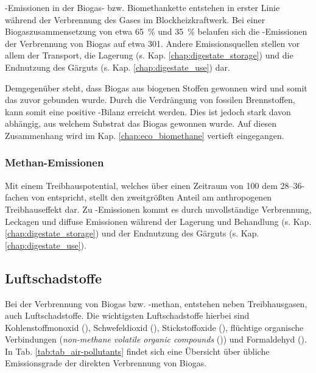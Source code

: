 -Emissionen in der Biogas- bzw. Biomethankette entstehen in erster Linie während der Verbrennung des Gases im Blockheizkraftwerk. Bei einer Biogaszusammensetzung von etwa \SI{65}{\percent}  und \SI{35}{\percent}  belaufen sich die -Emissionen der Verbrennung von Biogas auf etwa \SI[per-mode=symbol]{301}{\gcoeqkwh}. Andere Emissionsquellen stellen vor allem der Transport, die Lagerung (s. Kap. \ref{chap:digestate_storage}) und die Endnutzung des Gärguts (s. Kap. \ref{chap:digestate_use}) dar. \parencite{Nielsen2014} \parencite{Paolini2018} \smallskip

Demgegenüber steht, dass Biogas aus biogenen Stoffen gewonnen wird und somit das  zuvor gebunden wurde. Durch die Verdrängung von fossilen Brennstoffen, kann somit eine positive -Bilanz erreicht werden. Dies ist jedoch stark davon abhängig, aus welchem Substrat das Biogas gewonnen wurde. Auf diesen Zusammenhang wird im Kap. \ref{chap:eco_biomethane} vertieft eingegangen.


\subsubsection{Methan-Emissionen}

Mit einem Treibhauspotential, welches über einen Zeitraum von \SI{100}{\Jahren} dem \SIrange{28}{36}{\relax}-fachen von  entspricht, stellt  den zweitgrößten Anteil am anthropogenen Treibhauseffekt dar. Zu -Emissionen kommt es durch unvollständige Verbrennung, Leckagen und diffuse Emissionen während der Lagerung und Behandlung (s. Kap. \ref{chap:digestate_storage}) und der Endnutzung des Gärguts (s. Kap. \ref{chap:digestate_use}). \parencite{Paolini2018}


\subsection{Luftschadstoffe}

Bei der Verbrennung von Biogas bzw. -methan, entstehen neben Treibhausgasen, auch Luftschadstoffe. Die wichtigsten Luftschadstoffe hierbei sind Kohlenstoffmonoxid (), Schwefeldioxid (), Stickstoffoxide (), flüchtige organische Verbindungen (\textit{non-methane volatile organic compounds} ()) und Formaldehyd (). In Tab. \ref{tab:tab_air-pollutants} findet sich eine Übersicht über übliche Emissionsgrade der direkten Verbrennung von Biogas.



